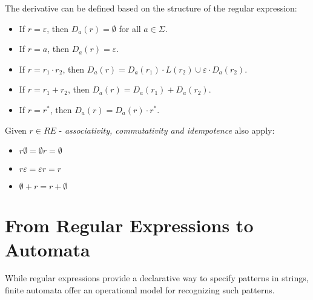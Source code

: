 The derivative can be defined based on the structure of the regular expression:

\begin{itemize}
    \item If $r = \varepsilon$, then $D_a(r) = \emptyset$ for all $a \in \Sigma$.
    \item If $r = a$, then $D_a(r) = \varepsilon$.
    \item If $r = r_1 \cdot r_2$, then $D_a(r) = D_a(r_1) \cdot L(r_2) \cup \varepsilon \cdot D_a(r_2)$.
    \item If $r = r_1 + r_2$, then $D_a(r) = D_a(r_1) + D_a(r_2)$.
    \item If $r = r^*$, then $D_a(r) = D_a(r) \cdot r^*$.
\end{itemize}

Given $r \in RE$ - \emph{associativity, commutativity and idempotence} also apply:
\begin{itemize}
    \item $r{\emptyset}={\emptyset}r={\emptyset}$
    \item $r{\varepsilon}={\varepsilon}r=r$
    \item ${\emptyset}+r=r+{\emptyset}$
\end{itemize}

\section{From Regular Expressions to Automata}
While regular expressions provide a declarative way to specify patterns in strings, finite automata offer an operational model for recognizing such patterns.


